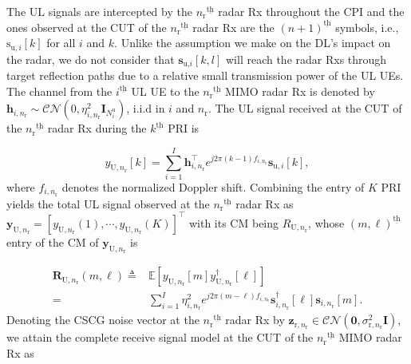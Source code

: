 \documentclass[9pt,journal]{IEEEtran}
\newcommand{\paren}[1]{\left({#1}\right)}
\newcommand{\bracket}[1]{{\left [{#1}\right ]}}
\newcommand{\ith}[1]    {{#1}^{\underline{\text{th}}}}
\newcommand{\rr}{_\mathrm{r}}
\newcommand{\rnr}{_{\mathrm{r},n_\mathrm{r}}}
\newcommand{\duin}{\mathbf{d}_{\textrm{u},i}\bracket{k,l}}
\newcommand{\PiB}{\mathbf{P}_{\textrm{u},i}\bracket{k}}
\begin{document}
The UL signals are intercepted by the $\ith{n\rr}$ radar Rx throughout the CPI and the ones observed at the CUT of the $\ith{n\rr}$ radar Rx are the $\ith{\paren{n+1}}$ symbols, i.e., $\mathrm{s}_{\textrm{u},i}\bracket{k}$ for all $i$ and $k$. 
Unlike the assumption we make on the DL's impact on the radar, we do not consider that $\mathbf{s}_{\textrm{u,}i}\bracket{k,l}$ will reach the radar Rxs through target reflection paths due to a relative small transmission power of the UL UEs. The channel from the $\ith{i}$ UL UE to the $\ith{n\rr}$ MIMO radar Rx is denoted by $\mathbf{h}_{i,n\rr}\sim\mathcal{CN}\paren{0,\eta^2_{i,n\rr}\mathbf{I}_{\mathit{N}^{\textrm{u}}_i}}$, i.i.d in $i$ and $n\rr$. 
The UL signal received at the CUT of the $\ith{n\rr}$ radar Rx during the $\ith{k}$ PRI is \par\noindent\small
\begin{equation*}
y_{\textrm{U},n\rr}\bracket{k}=\sum_{i=1}^{\mathit{I}}\mathbf{h}^\top_{i,n\rr}e^{j2\pi(k-1) f_{i,n_\mathrm{r}}}\mathbf{s}_{\textrm{u},i}\bracket{k},
\end{equation*}
where $f_{i,n_\mathrm{r}}$ denotes the normalized Doppler shift. Combining the entry of $\mathit{K}$ PRI yields the total UL signal observed at the $\ith{n\rr}$ radar Rx as  $\mathbf{y}_{\mathrm{U},n\rr}=\bracket{y_{\textrm{U},n\rr}\paren{1},\cdots,y_{\textrm{U},n\rr}\paren{\mathit{K}}}^\top$ with its CM being $\mathit{R}_{\mathrm{U},n\rr}$, whose
$\ith{\paren{m,\ell}}$ entry of the CM of $\mathbf{y}_{\mathrm{U},n\rr}$ is  \par\noindent\small
\begin{align}
\mathbf{R}_{\mathrm{U},n\rr}\paren{m,\ell}\triangleq&\mathbb{E}\bracket{y_{\mathrm{U},n\rr}\bracket{m}y^\dagger_{\mathrm{U},n\rr}\bracket{\ell}}\nonumber\\
=&\sum_{i=1}^{\mathit{I}}\eta^2_{i,n\rr}e^{j2\pi\paren{m-\ell}f_{i,n\rr}}\mathbf{s}^\dagger_{i,n\rr}\bracket{\ell}\mathbf{s}_{i,n\rr}\bracket{m}.
\end{align}\normalsize
Denoting the CSCG noise vector at the $\ith{n\rr}$ radar Rx by $\mathbf{z}\rnr\in\mathcal{CN}\paren{\mathbf{0},\sigma^2\rnr\mathbf{I}}$, we attain the complete receive signal model at the CUT of the $\ith{n\rr}$ MIMO radar Rx as\par\noindent\small
\end{document}

